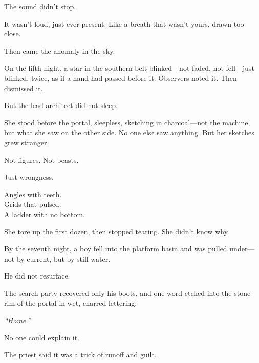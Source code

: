 \documentclass[12pt]{article}
\begin{document}
\vspace{0.5em}
The sound didn’t stop.

\vspace{0.5em}
It wasn’t loud, just ever-present. Like a breath that wasn’t yours, drawn too close.

\vspace{0.5em}
Then came the anomaly in the sky.

\vspace{0.5em}
On the fifth night, a star in the southern belt blinked---not faded, not fell---just blinked, twice, as if a hand had passed before it. Observers noted it. Then dismissed it.

\vspace{0.5em}
But the lead architect did not sleep.

\vspace{0.5em}
She stood before the portal, sleepless, sketching in charcoal---not the machine, but what she saw on the other side. No one else saw anything. But her sketches grew stranger.

\vspace{0.5em}
Not figures. Not beasts.

\vspace{0.5em}
Just wrongness.

\vspace{0.5em}
Angles with teeth.\\
Grids that pulsed.\\
A ladder with no bottom.

\vspace{0.5em}
She tore up the first dozen, then stopped tearing. She didn’t know why.

\vspace{0.5em}
By the seventh night, a boy fell into the platform basin and was pulled under---not by current, but by still water.

\vspace{0.5em}
He did not resurface.

\vspace{0.5em}
The search party recovered only his boots, and one word etched into the stone rim of the portal in wet, charred lettering:

\vspace{0.5em}
\textit{``Home.''}

\vspace{0.5em}
No one could explain it.

\vspace{0.5em}
The priest said it was a trick of runoff and guilt.
\end{document}
